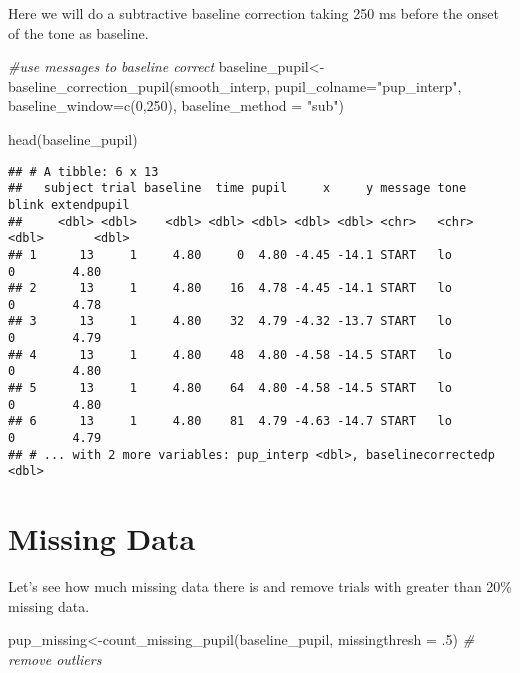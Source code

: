 \documentclass[
]{article}
\newenvironment{Shaded}{\begin{snugshade}}{\end{snugshade}}
\newcommand{\AttributeTok}[1]{\textcolor[rgb]{0.77,0.63,0.00}{#1}}
\newcommand{\CommentTok}[1]{\textcolor[rgb]{0.56,0.35,0.01}{\textit{#1}}}
\newcommand{\DecValTok}[1]{\textcolor[rgb]{0.00,0.00,0.81}{#1}}
\newcommand{\FunctionTok}[1]{\textcolor[rgb]{0.00,0.00,0.00}{#1}}
\newcommand{\NormalTok}[1]{#1}
\newcommand{\OtherTok}[1]{\textcolor[rgb]{0.56,0.35,0.01}{#1}}
\newcommand{\StringTok}[1]{\textcolor[rgb]{0.31,0.60,0.02}{#1}}
\begin{document}
Here we will do a subtractive baseline correction taking 250 ms before
the onset of the tone as baseline.

\begin{Shaded}
\begin{Highlighting}[]
\CommentTok{\#use messages to baseline correct}
\NormalTok{baseline\_pupil}\OtherTok{\textless{}{-}}\FunctionTok{baseline\_correction\_pupil}\NormalTok{(smooth\_interp, }\AttributeTok{pupil\_colname=}\StringTok{"pup\_interp"}\NormalTok{, }\AttributeTok{baseline\_window=}\FunctionTok{c}\NormalTok{(}\DecValTok{0}\NormalTok{,}\DecValTok{250}\NormalTok{), }\AttributeTok{baseline\_method =} \StringTok{"sub"}\NormalTok{)}

\FunctionTok{head}\NormalTok{(baseline\_pupil)}
\end{Highlighting}
\end{Shaded}

\begin{verbatim}
## # A tibble: 6 x 13
##   subject trial baseline  time pupil     x     y message tone  blink extendpupil
##     <dbl> <dbl>    <dbl> <dbl> <dbl> <dbl> <dbl> <chr>   <chr> <dbl>       <dbl>
## 1      13     1     4.80     0  4.80 -4.45 -14.1 START   lo        0        4.80
## 2      13     1     4.80    16  4.78 -4.45 -14.1 START   lo        0        4.78
## 3      13     1     4.80    32  4.79 -4.32 -13.7 START   lo        0        4.79
## 4      13     1     4.80    48  4.80 -4.58 -14.5 START   lo        0        4.80
## 5      13     1     4.80    64  4.80 -4.58 -14.5 START   lo        0        4.80
## 6      13     1     4.80    81  4.79 -4.63 -14.7 START   lo        0        4.79
## # ... with 2 more variables: pup_interp <dbl>, baselinecorrectedp <dbl>
\end{verbatim}

\hypertarget{missing-data}{%
\section{Missing Data}\label{missing-data}}

Let's see how much missing data there is and remove trials with greater
than 20\% missing data.

\begin{Shaded}
\begin{Highlighting}[]
\NormalTok{pup\_missing}\OtherTok{\textless{}{-}}\FunctionTok{count\_missing\_pupil}\NormalTok{(baseline\_pupil, }\AttributeTok{missingthresh =}\NormalTok{ .}\DecValTok{5}\NormalTok{)}
\CommentTok{\# remove outliers}
\end{Highlighting}
\end{Shaded}
\end{document}
